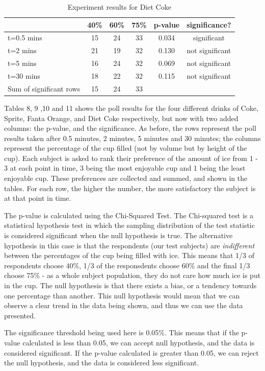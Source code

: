 \documentclass[oneside,12pt]{report}
\begin{document}
\begin{table}[ h]
\centering
\begin{tabular}{ l || c|c|c||c|c }
  &40\% &60\% & 75\% &p-value &significance? \\
\hline  
t=0.5 mins & 15 & 24 & 33&0.034&significant\\ 
\hline  
t=2 mins & 21& 19 & 32&0.130 &not significant\\ 
\hline  
t=5 mins & 16 & 24 & 32&0.069&not significant\\ 
\hline  
t=30 mins & 18 & 22& 32&0.115&not significant\\ 
\hline  
Sum of significant rows & 15 & 24 & 33 & & \\ 
\hline     
 \end{tabular}
\caption{Experiment results for Diet Coke}
\end{table}


Tables 8, 9 ,10 and 11 shows the poll results for the four different drinks of Coke, Sprite, Fanta Orange, and Diet Coke respectively, but now with two added columns: the p-value, and the significance. As before, the rows represent the poll results taken after 0.5 minutes, 2 minutes, 5 minutes and 30 minutes; the columns represent the percentage of the cup filled (not by volume but by height of the cup). Each subject is asked to rank their preference of the amount of ice from 1 - 3 at each point in time, 3 being the most enjoyable cup and 1 being the least enjoyable cup. These preferences are collected and summed, and shown in the tables. For each row, the higher the number, the more satisfactory the subject is at that point in time. 

The p-value is calculated using the Chi-Squared Test. The Chi-squared test is a statistical hypothesis test in which the sampling distribution of the test statistic is considered significant when the null hypothesis is true. The alternative hypothesis in this case is that the respondents (our test subjects) are \emph{indifferent} between the percentages of the cup being filled with ice. This means that 1/3 of respondents choose 40\%, 1/3 of the responsdents choose 60\% and the final 1/3 choose 75\% - as a whole subject population, they do not care how much ice is put in the cup. The null hypothesis is that there exists a bias, or a tendency towards one percentage than another. This null hypothesis would mean that we can observe a clear trend in the data being shown, and thus we can use the data presented. 

\vspace{6pt}
The significance threshold being used here is 0.05\%. This means that if the p-value calculated is less than 0.05, we can accept null hypothesis, and the data is considered significant. If the p-value calculated is greater than 0.05, we can reject the null hypothesis, and the data is considered less significant. 
\end{document}
